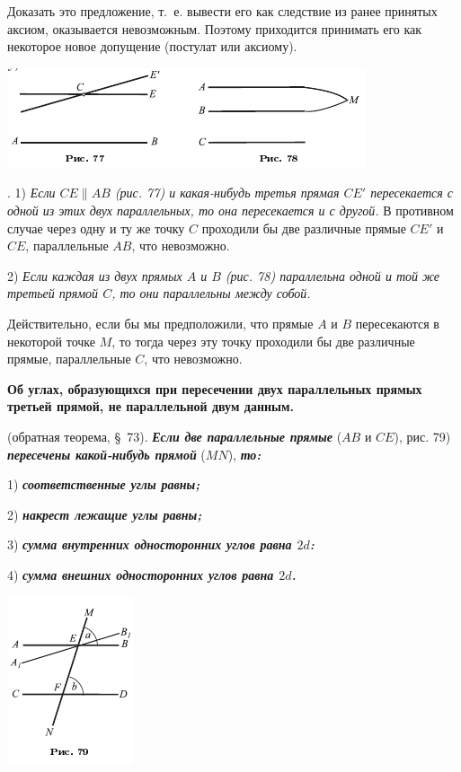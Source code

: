 \documentclass[oneside]{book}
\begin{document}
Доказать это предложение, т.~е. вывести его как следствие из ранее принятых аксиом, оказывается невозможным.
Поэтому приходится принимать его как некоторое новое допущение (постулат или аксиому).

\includegraphics{pics/ris-77-78}

.
1) \emph{Если $CE\parallel AB$ \emph{(рис. 77)} и какая-нибудь третья прямая $CE'$ пересекается с одной из этих двух параллельных, то она пересекается и с другой.}
В противном случае через одну и ту же точку $C$ проходили бы две различные прямые $CE'$ и $CE$, параллельные $AB$, что невозможно.

2) \emph{Если каждая из двух прямых $A$ и $B$ \emph{(рис. 78)} параллельна одной и той же третьей прямой $C$, то они параллельны между собой.}

Действительно, если бы мы предположили, что прямые $A$ и $B$ пересекаются в некоторой точке $M$, то тогда через эту точку проходили бы две различные прямые, параллельные $C$, что невозможно.

\textbf{Об углах, образующихся при пересечении двух параллельных прямых третьей прямой, не параллельной двум данным.}

 (обратная теорема, §~73).
\textbf{\emph{Если две параллельные прямые}} ($AB$ и $CE$), рис. 79) \textbf{\emph{пересечены какой-нибудь прямой}} ($MN$), \textbf{\emph{то:}}


1) \textbf{\emph{соответственные углы равны;}}

2) \textbf{\emph{накрест лежащие углы равны;}}

3) \textbf{\emph{сумма внутренних односторонних углов равна $2d$:}}

4) \textbf{\emph{сумма внешних односторонних углов равна $2d$.}}

\includegraphics{pics/ris-79}
\end{document}
